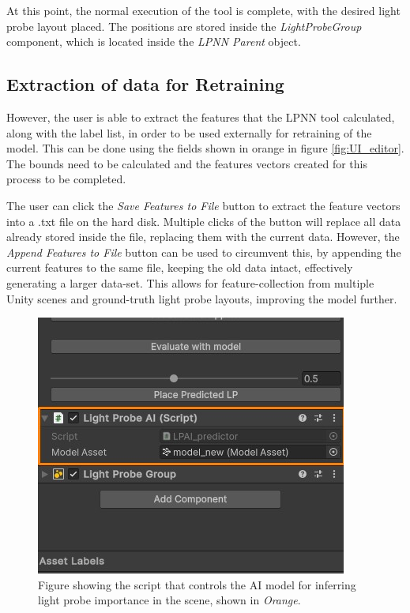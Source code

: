 At this point, the normal execution of the tool is complete, with the desired light probe layout placed. The positions are stored inside the \textit{LightProbeGroup} component, which is located inside the \textit{LPNN Parent} object. 

\subsection{Extraction of data for Retraining}
However, the user is able to extract the features that the LPNN tool calculated, along with the label list, in order to be used externally for retraining of the model. This can be done using the fields shown in orange in figure \ref{fig:UI_editor}. The bounds need to be calculated and the features vectors created for this process to be completed. 

The user can click the \textit{Save Features to File} button to extract the feature vectors into a .txt file on the hard disk. Multiple clicks of the button will replace all data already stored inside the file, replacing them with the current data. However, the \textit{Append Features to File} button can be used to circumvent this, by appending the current features to the same file, keeping the old data intact, effectively generating a larger data-set. This allows for feature-collection from multiple Unity scenes and ground-truth light probe layouts, improving the model further.

\begin{figure}[h]
	\centering
	\includegraphics[scale=0.7]{Graphics/UI_ai.jpg}
	\caption{Figure showing the script that controls the AI model for inferring light probe importance in the scene, shown in \textit{Orange}.}
	\label{fig:UI_ai}
\end{figure}

